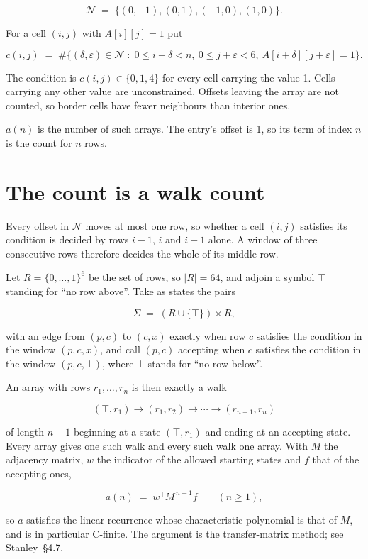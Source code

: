 \documentclass[11pt]{article}
\theoremstyle{definition}
\begin{document}
\[\mathcal{N} \;=\; \{(0,-1), (0,1), (-1,0), (1,0)\}.\]

For a cell $(i,j)$ with $A[i][j] = 1$ put

\[c(i,j) \;=\; \#\bigl\{(\delta,\varepsilon)\in\mathcal{N} \;:\; 0\le i+\delta<n,\ 0\le j+\varepsilon<6,\ A[i+\delta][j+\varepsilon] = 1\bigr\}.\]

The condition is $c(i,j) \in \{0, 1, 4\}$ for every cell carrying the value 1. Cells carrying any other value are unconstrained. Offsets leaving the array are not counted, so border cells have fewer neighbours than interior ones.

$a(n)$ is the number of such arrays. The entry's offset is 1, so its term of index $n$ is the count for $n$ rows.

\section{The count is a walk count}

Every offset in $\mathcal{N}$ moves at most one row, so whether a cell $(i,j)$ satisfies its condition is decided by rows $i-1$, $i$ and $i+1$ alone. A window of three consecutive rows therefore decides the whole of its middle row.

Let $R = \{0,\dots,1\}^{6}$ be the set of rows, so $|R| = 64$, and adjoin a symbol $\top$ standing for ``no row above''. Take as states the pairs

\[\Sigma \;=\; (R \cup \{\top\}) \times R,\]

with an edge from $(p,c)$ to $(c,x)$ exactly when row $c$ satisfies the condition in the window $(p,c,x)$, and call $(p,c)$ accepting when $c$ satisfies the condition in the window $(p,c,\bot)$, where $\bot$ stands for ``no row below''.

An array with rows $r_1,\dots,r_n$ is then exactly a walk

\[(\top,r_1) \to (r_1,r_2) \to \cdots \to (r_{n-1},r_n)\]

of length $n-1$ beginning at a state $(\top,r_1)$ and ending at an accepting state. Every array gives one such walk and every such walk one array. With $M$ the adjacency matrix, $w$ the indicator of the allowed starting states and $f$ that of the accepting ones,

\[a(n) \;=\; w^{\mathsf T} M^{\,n-1} f \qquad (n \ge 1),\]

so $a$ satisfies the linear recurrence whose characteristic polynomial is that of $M$, and is in particular C-finite. The argument is the transfer-matrix method; see Stanley~\S4.7.
\end{document}
